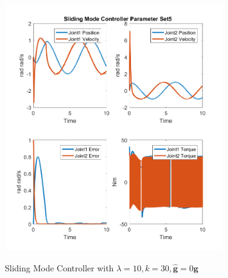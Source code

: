 \begin{figure}[]
	\centering
	\includegraphics[width=0.85\textwidth]{pics/SlidingModeControllerParameterSet5.png}\\
	\caption{Sliding Mode Controller with $\lambda = 10, k=30,\hat{\mathbf{g}}=0\mathbf{g}$  }
	\label{fig:ch5_smo5}
\end{figure}

